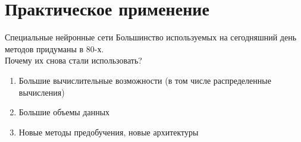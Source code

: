 \documentclass[10pt]{beamer}
\begin{document}



\section{Практическое применение}

\begin{frame}{Специальные нейронные сети}
	Большинство используемых на сегодняшний день методов придуманы в 80-х.\\
	Почему их снова стали использовать?\\
	\pause
	\begin{enumerate}[--]
		\item Большие вычислительные возможности (в том числе
		распределенные вычисления)
		\item Большие объемы данных
		\item Новые методы предобучения, новые архитектуры
	\end{enumerate}
\end{frame}
\end{document}
